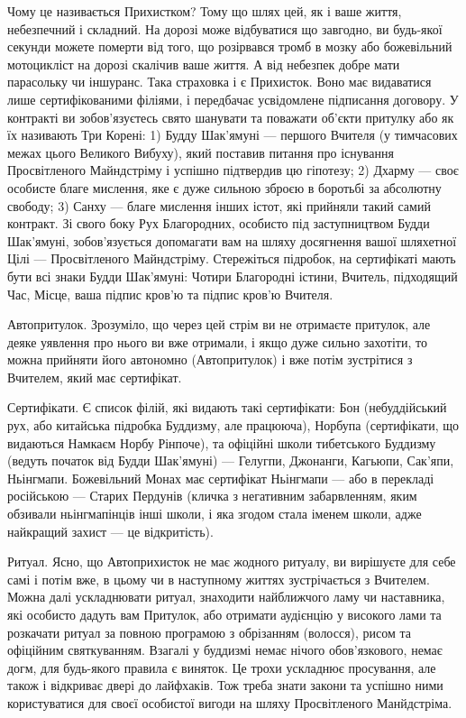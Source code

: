 Чому це називається Прихистком? Тому що шлях цей, як і
ваше життя, небезпечний і складний. На дорозі може відбуватися що
завгодно, ви будь-якої секунди можете померти від того, що розірвався
тромб в мозку або божевільний мотоцикліст на дорозі скалічив ваше життя.
А від небезпек добре мати парасольку чи іншуранс. Така страховка
і є Прихисток. Воно має видаватися лише сертифікованими
філіями, і передбачає усвідомлене підписання договору.
У контракті ви зобов'язуєтесь свято шанувати та поважати об'єкти
притулку або як їх називають Три Корені: 1) Будду Шак'ямуні ---
першого Вчителя (у тимчасових межах цього Великого Вибуху), який
поставив питання про існування Просвітленого Майндстріму
і успішно підтвердив цю гіпотезу; 2) Дхарму --- своє особисте
благе мислення, яке є дуже сильною зброєю в
боротьбі за абсолютну свободу; 3) Санху --- благе мислення
інших істот, які прийняли такий самий контракт. Зі свого боку
Рух Благородних, особисто під заступництвом Будди Шак'ямуні,
зобов'язується допомагати вам на шляху досягнення вашої шляхетної
Цілі --- Просвітленого Майндстріму. Стережіться підробок,
на сертифікаті мають бути всі знаки Будди Шак'ямуні: Чотири
Благородні істини, Вчитель, підходящий Час, Місце, ваша
підпис кров'ю та підпис кров'ю Вчителя.

Автопритулок. Зрозуміло, що через цей стрім ви не отримаєте
притулок, але деяке уявлення про нього ви вже отримали,
і якщо дуже сильно захотіти, то можна прийняти його автономно
(Автопритулок) і вже потім зустрітися з Вчителем, який
має сертифікат.

Сертифікати. Є список філій, які видають такі сертифікати:
Бон (небуддійський рух, або китайська підробка Буддизму,
але працююча), Норбупа (сертифікати, що видаються Намкаєм Норбу
Рінпоче), та офіційні школи тибетського Буддизму (ведуть
початок від Будди Шак'ямуні) --- Гелугпи, Джонанги, Кагьюпи,
Сак'япи, Ньінгмапи. Божевільний Монах має сертифікат Ньінгмапи
--- або в перекладі російською --- Старих Пердунів (кличка
з негативним забарвленням, яким обзивали ньінгмапінців
інші школи, і яка згодом стала іменем школи, адже найкращий захист --- це відкритість).

Ритуал. Ясно, що Автоприхисток не має жодного ритуалу,
ви вирішуєте для себе самі і потім вже, в цьому чи в наступному
життях зустрічається з Вчителем. Можна далі ускладнювати ритуал,
знаходити найближчого ламу чи наставника, які особисто дадуть
вам Притулок, або отримати аудієнцію у високого лами та
розкачати ритуал за повною програмою з обрізанням (волосся),
рисом та офіційним святкуванням. Взагалі у буддизмі немає
нічого обов'язкового, немає догм, для будь-якого правила є
виняток. Це трохи ускладнює просування, але також
і відкриває двері до лайфхаків. Тож треба знати закони
та успішно ними користуватися для своєї особистої вигоди на шляху
Просвітленого Манйдстріма.
